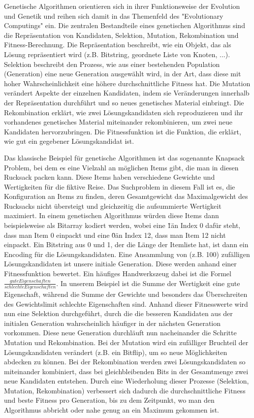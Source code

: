 Genetische Algorithmen orientieren sich in ihrer Funktionsweise der Evolution und Genetik und reihen sich damit in das  Themenfeld des "Evolutionary Computings" ein.
Die zentralen Bestandteile eines genetischen Algorithmus sind die Repräsentation von Kandidaten, Selektion, Mutation, Rekombination und Fitness-Berechnung. Die Repräsentation beschreibt, wie ein Objekt, das als Lösung repräsentiert wird (z.B. Bitstring, geordnete Liste von Knoten, ...). Selektion beschreibt den Prozess, wie aus einer bestehenden Population (Generation) eine neue Generation ausgewählt wird, in der Art, dass diese mit hoher Wahrscheinlichkeit eine höhere durchschnittliche Fitness hat. Die Mutation verändert Aspekte der einzelnen Kandidaten, indem sie Veränderungen innerhalb der Repräsentation durchführt und so neues genetisches Material einbringt. Die Rekombination erklärt, wie zwei Lösungskandidaten sich reproduzieren und ihr vorhandenes genetisches Material miteinander rekombinieren, um zwei neue Kandidaten hervorzubringen. Die Fitnessfunktion ist die Funktion, die erklärt, wie gut ein gegebener Lösungskandidat ist.

Das klassische Beispiel für genetische Algorithmen ist das sogenannte Knapsack Problem, bei dem es eine Vielzahl an möglichen Items gibt, die man in diesen Rucksack packen kann. Diese Items haben verschiedene Gewichte und Wertigkeiten für die fiktive Reise. Das Suchproblem in diesem Fall ist es, die Konfiguration an Items zu finden, deren Gesamtgewicht das Maximalgewicht des Rucksacks nicht übersteigt und gleichzeitig die aufsummierte Wertigkeit maximiert.
In einem genetischen Algorithmus würden diese Items dann beispielsweise als Bitarray kodiert werden, wobei eine \"1\" an Index 0 dafür steht, dass man Item 0 einpackt und eine \"0\" an Index 12, dass man Item 12 nicht einpackt. Ein Bitstring aus 0 und 1, der die Länge der Itemliste hat, ist dann ein Encoding für die Lösungskandidaten. Eine Ansammlung von (z.B. 100) zufälligen Lösungskandidaten ist unsere initiale Generation. Diese werden anhand einer Fitnessfunktion bewertet. Ein häufiges Handwerkszeug dabei ist die Formel $ \frac{gute Eigenschaften}{schlechte Eigenschaften}$. In unserem Beispiel ist die Summe der Wertigkeit eine gute Eigenschaft, während die Summe der Gewichte und besonders das Überschreiten des Gewichtslimit schlechte Eigenschaften sind. Anhand dieser Fitnesswerte wird nun eine Selektion durchgeführt, durch die die besseren Kandidaten aus der initialen Generation wahrscheinlich häufiger in der nächsten Generation vorkommen. Diese neue Generation durchläuft nun nacheinander die Schritte Mutation und Rekombination. Bei der Mutation wird ein zufälliger Bruchteil der Lösungskandidaten verändert (z.B. ein Bitflip), um so neue Möglichkeiten abdecken zu können. Bei der Rekombination werden zwei Lösungskandidaten so miteinander kombiniert, dass bei gleichbleibenden Bits in der Gesamtmenge zwei neue Kandidaten entstehen. Durch eine Wiederholung dieser Prozesse (Selektion, Mutation, Rekombination) verbessert sich dadurch die durchschnittliche Fitness und beste Fitness pro Generation, bis zu dem Zeitpunkt, wo man den Algorithmus abbricht oder nahe genug an ein Maximum gekommen ist.


